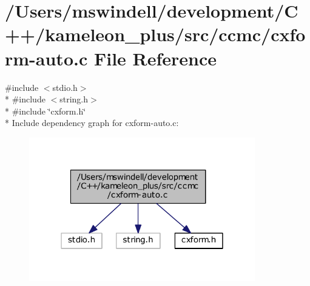 \hypertarget{cxform-auto_8c}{\section{/\-Users/mswindell/development/\-C++/kameleon\-\_\-plus/src/ccmc/cxform-\/auto.c File Reference}
\label{cxform-auto_8c}
}
{\ttfamily \#include $<$stdio.\-h$>$}\\*
{\ttfamily \#include $<$string.\-h$>$}\\*
{\ttfamily \#include \char`\"{}cxform.\-h\char`\"{}}\\*
Include dependency graph for cxform-\/auto.c\-:
\nopagebreak
\begin{figure}[H]
\begin{center}
\leavevmode
\includegraphics[width=279pt]{cxform-auto_8c__incl}
\end{center}
\end{figure}
